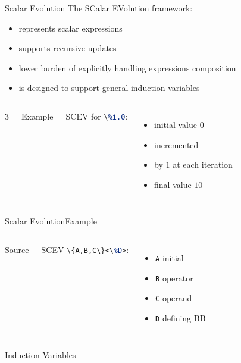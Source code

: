 \documentclass[10pt,mathserif]{beamer}
\newcommand{\cinput}[1]{}
\newcommand{\llvminput}[1]{}
\newcommand{\llvminline}[1]{\lstinline[language=LLVM]!#1!}
\begin{document}
\begin{frame}{Scalar Evolution}
The \alert{SC}alar \alert{EV}olution framework:

\begin{itemize}
\item represents scalar expressions
\item supports recursive updates
\item lower burden of explicitly handling expressions composition
\item is designed to support \alert{general induction variables}
\end{itemize}

\begin{columns}3
\begin{block}{Example}
\centering
\llvminput{snippet/02/basic-scev.ll}
\end{block}

SCEV for \llvminline{\%i.0}:

\begin{itemize}
\item initial value $0$
\item incremented
\item by $1$ at each iteration
\item final value $10$
\end{itemize}
\end{columns}
\end{frame}

\begin{frame}{Scalar Evolution}{Example}
\begin{columns}
\begin{block}{Source}
\centering
\cinput{snippet/02/nested-scev.c}
\end{block}

SCEV \llvminline{\{A,B,C\}<\%D>}:

\begin{itemize}
\item \llvminline{A} initial
\item \llvminline{B} operator
\item \llvminline{C} operand
\item \llvminline{D} defining BB
\end{itemize}
\end{columns}

\begin{block}{Induction Variables}
\centering
\llvminput{snippet/02/nested-scev-induction.ll}
\end{block}
\end{frame}
\end{document}
